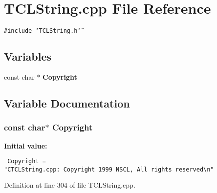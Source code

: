 \section{TCLString.cpp File Reference}
\label{TCLString_8cpp}
{\tt \#include \char`\"{}TCLString.h\char`\"{}}\par
\subsection*{Variables}
\begin{CompactItemize}
\item 
const char $\ast$ {\bf Copyright}
\end{CompactItemize}


\subsection{Variable Documentation}
\subsubsection{\setlength{\rightskip}{0pt plus 5cm}const char$\ast$ Copyright\hspace{0.3cm}{\tt  [static]}}\label{TCLString_8cpp_a0}


{\bf Initial value:}

\footnotesize\begin{verbatim} Copyright = 
"CTCLString.cpp: Copyright 1999 NSCL, All rights reserved\n"\end{verbatim}\normalsize 


Definition at line 304 of file TCLString.cpp.